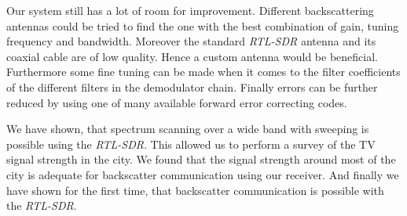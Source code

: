 \documentclass[conference]{IEEEtran}
\begin{document}
Our system still has a lot of room for improvement.  Different
backscattering antennas could be tried to find the one with the best
combination of gain, tuning frequency and bandwidth. Moreover the
standard \textit{RTL-SDR} antenna and its coaxial cable are of low
quality.  Hence a custom antenna would be beneficial. Furthermore some
fine tuning can be made when it comes to the filter coefficients of the
different filters in the demodulator chain. Finally  errors can be
further reduced by using one of many available forward error correcting
codes.

We have shown, that
spectrum scanning over a wide band with sweeping is possible using the
\textit{RTL-SDR}.  This allowed us to perform a survey of the TV signal
strength in the city. We found that the signal strength around most of the city
is adequate for backscatter communication using our receiver. And finally we
have shown for the first time, that backscatter communication is possible with
the \textit{RTL-SDR}.



\end{document}
